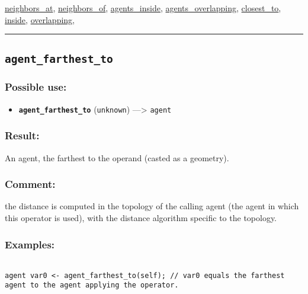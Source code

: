 \documentclass[]{book}
\providecommand{\tightlist}{%
  \setlength{\itemsep}{0pt}\setlength{\parskip}{0pt}}
\theoremstyle{definition}
\theoremstyle{definition}
\theoremstyle{definition}
\theoremstyle{remark}
\begin{document}
\href{OperatorsNR\#neighbors_at}{neighbors\_at},
\href{OperatorsNR\#neighbors_of}{neighbors\_of},
\href{OperatorsAA\#agents_inside}{agents\_inside},
\href{OperatorsAA\#agents_overlapping}{agents\_overlapping},
\href{OperatorsBC\#closest_to}{closest\_to},
\href{OperatorsIM\#inside}{inside},
\href{OperatorsNR\#overlapping}{overlapping},

\begin{center}\rule{0.5\linewidth}{\linethickness}\end{center}

\subsection{\texorpdfstring{\texttt{agent\_farthest\_to}}{agent\_farthest\_to}}\label{agent_farthest_to}

\subsubsection{Possible use:}\label{possible-use-27}

\begin{itemize}
\tightlist
\item
  \textbf{\texttt{agent\_farthest\_to}} (\texttt{unknown})
  ---\textgreater{} \texttt{agent}
\end{itemize}

\subsubsection{Result:}\label{result-26}

An agent, the farthest to the operand (casted as a geometry).

\subsubsection{Comment:}\label{comment-5}

the distance is computed in the topology of the calling agent (the agent
in which this operator is used), with the distance algorithm specific to
the topology.

\subsubsection{Examples:}\label{examples-20}

\begin{verbatim}
 
agent var0 <- agent_farthest_to(self); // var0 equals the farthest agent to the agent applying the operator.
\end{verbatim}
\end{document}
